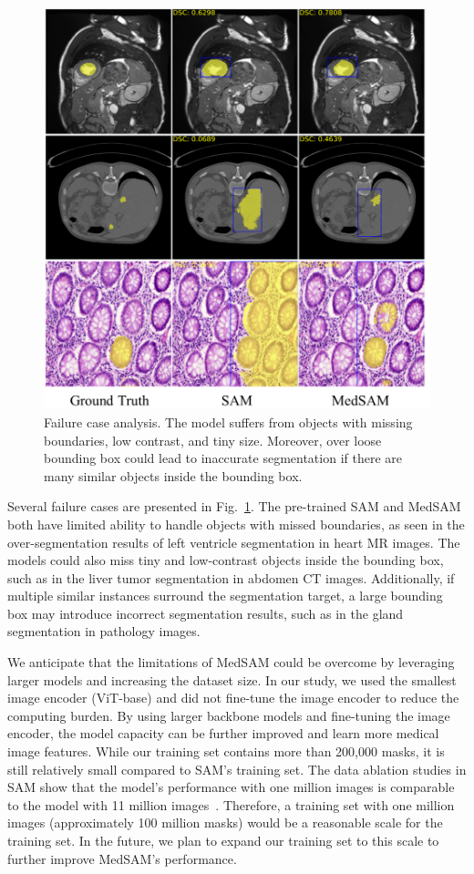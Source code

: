 \documentclass[runningheads]{llncs}
\begin{document}
\begin{figure}[htbp]
\centering
\includegraphics[scale=0.8]{imgs/fig6-bad-seg.png}
\caption{Failure case analysis. The model suffers from objects with missing boundaries, low contrast, and tiny size. Moreover, over loose bounding box could lead to inaccurate segmentation if there are many similar objects inside the bounding box.}
\label{fig:failed}
\end{figure}

Several failure cases are presented in Fig.~\ref{fig:failed}. The pre-trained SAM and MedSAM both have limited ability to handle objects with missed boundaries, as seen in the over-segmentation results of left ventricle segmentation in heart MR images. The models could also miss tiny and low-contrast objects inside the bounding box, such as in the liver tumor segmentation in abdomen CT images. Additionally, if multiple similar instances surround the segmentation target, a large bounding box may introduce incorrect segmentation results, such as in the gland segmentation in pathology images.

We anticipate that the limitations of MedSAM could be overcome by leveraging larger models and increasing the dataset size. In our study, we used the smallest image encoder (ViT-base) and did not fine-tune the image encoder to reduce the computing burden. By using larger backbone models and fine-tuning the image encoder, the model capacity can be further improved and learn more medical image features. While our training set contains more than 200,000 masks, it is still relatively small compared to SAM's training set. The data ablation studies in SAM show that the model's performance with one million images is comparable to the model with 11 million images~\cite{2023-SAM-Meta}. Therefore, a training set with one million images (approximately 100 million masks) would be a reasonable scale for the training set. In the future, we plan to expand our training set to this scale to further improve MedSAM's performance.
\end{document}
